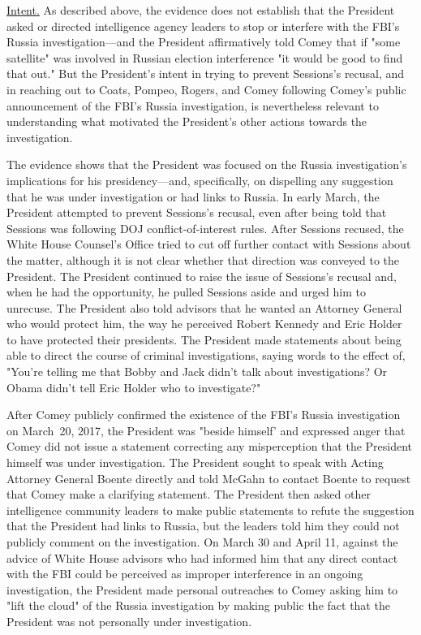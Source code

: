 \underline{Intent.}
As described above, the evidence does not establish that the President asked or directed intelligence agency leaders to stop or interfere with the FBI's Russia investigation---and the President affirmatively told Comey that if "some satellite" was involved in Russian election interference "it would be good to find that out."
But the President's intent in trying to prevent Sessions's recusal, and in reaching out to Coats, Pompeo, Rogers, and Comey following Comey's public announcement of the FBI's Russia investigation, is nevertheless relevant to understanding what motivated the President's other actions towards the investigation.

The evidence shows that the President was focused on the Russia investigation's implications for his presidency---and, specifically, on dispelling any suggestion that he was under investigation or had links to Russia.
In early March, the President attempted to prevent Sessions's recusal, even after being told that Sessions was following DOJ conflict-of-interest rules.
After Sessions recused, the White House Counsel's Office tried to cut off further contact with Sessions about the matter, although it is not clear whether that direction was conveyed to the President.
The President continued to raise the issue of Sessions's recusal and, when he had the opportunity, he pulled Sessions aside and urged him to unrecuse.
The President also told advisors that he wanted an Attorney General who would protect him, the way he perceived Robert Kennedy and Eric Holder to have protected their presidents.
The President made statements about being able to direct the course of criminal investigations, saying words to the effect of, "You're telling me that Bobby and Jack didn't talk about investigations?
Or Obama didn't tell Eric Holder who to investigate?"

After Comey publicly confirmed the existence of the FBI's Russia investigation on March~20, 2017, the President was "beside himself' and expressed anger that Comey did not issue a statement correcting any misperception that the President himself was under investigation.
The President sought to speak with Acting Attorney General Boente directly and told McGahn to contact Boente to request that Comey make a clarifying statement.
The President then asked other intelligence community leaders to make public statements to refute the suggestion that the President had links to Russia, but the leaders told him they could not publicly comment on the investigation.
On March 30 and April 11, against the advice of White House advisors who had informed him that any direct contact with the FBI could be perceived as improper interference in an ongoing investigation, the President made personal outreaches to Comey asking him to "lift the cloud" of the Russia investigation by making public the fact that the President was not personally under investigation.

